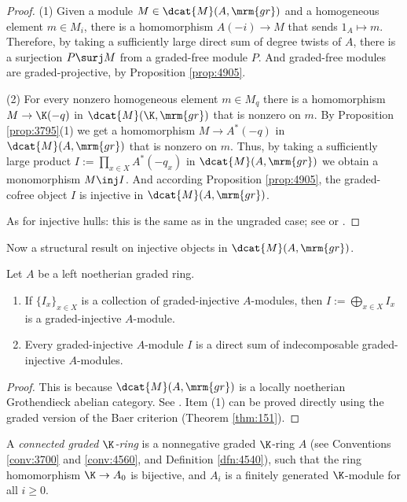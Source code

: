 \begin{proof}
(1) Given a module $M \in \dcat{M}(A, \mrm{gr})$ and a homogeneous element 
$m \in M_i$, there is a homomorphism 
$A(-i) \to M$ that sends $1_A \mapsto m$. Therefore, by taking a sufficiently 
large direct sum of degree twists of $A$, there is a surjection 
$P \surj M$ from a graded-free module $P$. And graded-free modules are 
graded-projective, by Proposition \ref{prop:4905}. 

\medskip \noindent
(2) For every nonzero homogeneous element $m \in M_q$ there is a homomorphism 
$M \to \K(-q)$ in $\dcat{M}(\K, \mrm{gr})$
that is nonzero on $m$. By Proposition \ref{prop:3795}(1)
we get a homomorphism $M \to A^*(-q)$ in $\dcat{M}(A, \mrm{gr})$
that is nonzero on $m$. Thus, by taking a sufficiently large product 
$I :=  \prod_{x \in X} A^*(-q_x)$
in $\dcat{M}(A, \mrm{gr})$ we obtain a monomorphism $M \inj I$. And according 
Proposition \ref{prop:4905},  the graded-cofree object $I$ is injective in 
$\dcat{M}(A, \mrm{gr})$.

As for injective hulls: this is the same as in the ungraded case; see 
\cite[Theorem 3.30]{Rot} or \cite[Section 3.D]{Lam}.
\end{proof}

Now a structural result on injective objects in $\dcat{M}(A, \mrm{gr})$. 

\begin{thm} \label{thm:3795}
Let $A$ be a left noetherian graded ring. 
\begin{enumerate}
\item If $\{ I_x \}_{x \in X}$ is a collection of graded-injective $A$-modules, 
then $I := \bigoplus_{x \in X} I_x$ is a  graded-injective $A$-module. 

\item Every graded-injective $A$-module $I$ is a direct sum of indecomposable
graded-injective $A$-modules. 
\end{enumerate} 
\end{thm}

\begin{proof}
This is because $\dcat{M}(A, \mrm{gr})$ is a locally noetherian Grothendieck 
abelian category. See \cite[Section V.4]{Ste}.
Item (1) can be proved directly using the graded version of the Baer criterion 
(Theorem \ref{thm:151}). 
\end{proof}

\begin{dfn}  \label{dfn:3703}
A {\em connected graded $\K$-ring} 
is a nonnegative graded $\K$-ring 
$A$ (see Conventions \ref{conv:3700} and 
\ref{conv:4560},  and Definition \ref{dfn:4540}), such that  the ring 
homomorphism $\K \to A_0$ is bijective, 
and $A_i$ is a finitely generated $\K$-module for all $i \geq 0$. 
\end{dfn}

